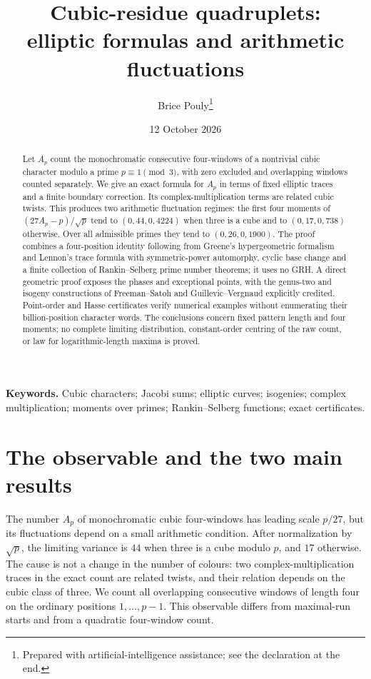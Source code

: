 \documentclass[11pt]{article}
\title{Cubic-residue quadruplets:\\
elliptic formulas and arithmetic fluctuations}
\author{Brice Pouly\thanks{Prepared with artificial-intelligence assistance; see the declaration at the end.}}
\date{12 October 2026}
\theoremstyle{definition}\newtheorem{definition}[theorem]{Definition}
\begin{document}
\maketitle
\begin{abstract}
Let $A_p$ count the monochromatic consecutive four-windows of a nontrivial
cubic character modulo a prime $p\equiv1\pmod3$, with zero excluded and
overlapping windows counted separately. We give an exact formula for
$A_p$ in terms of fixed elliptic traces and a finite boundary correction.
Its complex-multiplication terms are related cubic twists. This produces
two arithmetic fluctuation regimes: the first four moments of
$(27A_p-p)/\sqrt p$ tend to $(0,44,0,4224)$ when three is a cube and
to $(0,17,0,738)$ otherwise. Over all admissible primes they tend to
$(0,26,0,1900)$. The proof combines a four-position identity following
from Greene's hypergeometric formalism and Lennon's trace formula with
symmetric-power automorphy, cyclic base change and a finite collection of
Rankin--Selberg prime number theorems; it uses no GRH. A direct geometric
proof exposes the phases and exceptional points, with the genus-two and
isogeny constructions of Freeman--Satoh and Guillevic--Vergnaud explicitly
credited. Point-order and Hasse certificates verify numerical examples
without enumerating their billion-position character words. The
conclusions concern fixed pattern length and four moments; no complete
limiting distribution, constant-order centring of the raw count, or law
for logarithmic-length maxima is proved.
\end{abstract}
\noindent\textbf{Keywords.} Cubic characters; Jacobi sums; elliptic
curves; isogenies; complex multiplication; moments over primes;
Rankin--Selberg functions; exact certificates.

\section{The observable and the two main results}
The number $A_p$ of monochromatic cubic four-windows has leading scale
$p/27$, but its fluctuations depend on a small arithmetic condition.
After normalization by $\sqrt p$, the limiting variance is $44$ when
three is a cube modulo $p$, and $17$ otherwise. The cause is not a change
in the number of colours: two complex-multiplication traces in the exact
count are related twists, and their relation depends on the cubic class
of three. We count all overlapping consecutive windows of length four
on the ordinary positions $1,\ldots,p-1$. This observable differs from
maximal-run starts and from a quadratic four-window count.
\end{document}
